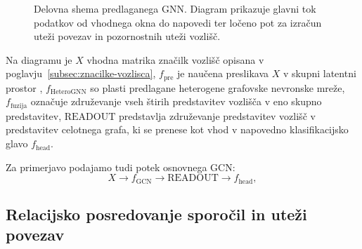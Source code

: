 \begin{figure}[H]
{%
    }
    \caption{Delovna shema predlaganega GNN. Diagram prikazuje glavni tok podatkov od vhodnega okna do napovedi ter ločeno pot za izračun uteži povezav in pozornostnih uteži vozlišč.}
    \label{fig:predlagani-gnn-delovni-diagram}
\end{figure}


Na diagramu je $X$ vhodna matrika značilk vozlišč opisana v poglavju~\ref{subsec:znacilke-vozlisca}, $f_{\text{pre}}$ je naučena preslikava $X$ v skupni latentni prostor
, $f_{\text{HeteroGNN}}$ so plasti predlagane heterogene grafovske nevronske mreže, $f_{\text{fuzija}}$ označuje združevanje vseh štirih predstavitev vozlišča v eno skupno predstavitev, $\text{READOUT}$ predstavlja združevanje predstavitev vozlišč v predstavitev celotnega grafa, ki se prenese kot vhod v napovedno klasifikacijsko glavo $f_{\text{head}}$. 

Za primerjavo podajamo tudi potek osnovnega GCN:
\begin{equation}
    X
    \rightarrow
    f_{\text{GCN}}
    \rightarrow
    \text{READOUT}
    \rightarrow
    f_{\text{head}},
\end{equation}


\subsection{Relacijsko posredovanje sporočil in uteži povezav}
\label{subsec:relacijsko-posredovanje}

